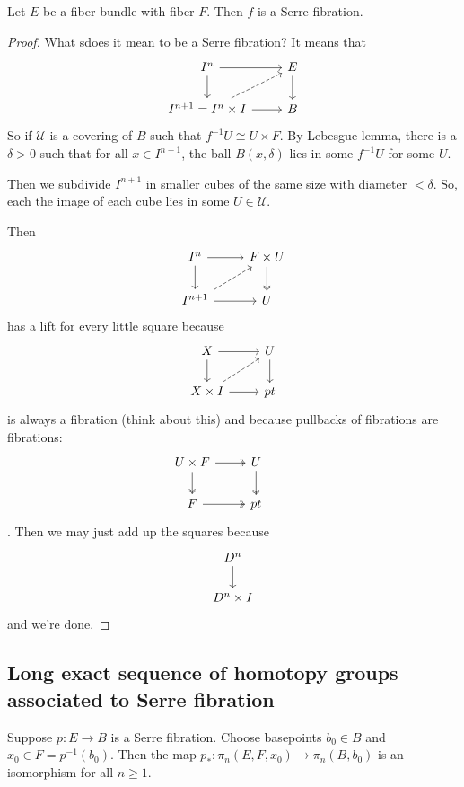 \begin{definition}
\begin{proposition}[Hatcher, 4.48]
	Let $E$ be a fiber bundle with fiber $F$. Then $f$ is a Serre fibration.
\end{proposition}
\begin{proof}
	What sdoes it mean to be a Serre fibration? It means that
	$$\begin{tikzcd}
		I^n\arrow[r]\arrow[d]&E\arrow[d]\\
		I^{n+1}=I^n\times I\arrow[r]\arrow[ur,dashed]&B
	\end{tikzcd}$$
	So if $\mathcal{U}$ is a covering of $B$ such that $f^{-1}U\cong U\times F$. By Lebesgue lemma, there is a $\delta>0$ such that for all $x\in I^{n+1}$, the ball $B(x,\delta)$ lies in some $f^{-1}U$ for some $U$.
	
	Then we subdivide $I^{n+1}$ in smaller cubes of the same size with diameter $<\delta$. So, each the image of each cube lies in some $U\in\mathcal{U}$.
	
	Then
	$$\begin{tikzcd}
		I^n\arrow[d]\arrow[r]&F\times U\arrow[d,two heads]\\
		I^{n+1}\arrow[r]\arrow[ur,dashed]&U
	\end{tikzcd}$$
	has a lift for every little square because
	$$\begin{tikzcd}
		X\arrow[r]\arrow[d]&U\arrow[d]\\
		X\times I\arrow[r]\arrow[ur,dashed]&pt
	\end{tikzcd}$$
	is always a fibration {\color{orange}(think about this)} and because pullbacks of fibrations are fibrations:
	$$\begin{tikzcd}
		U\times F\arrow[r,two heads]\arrow[d,two heads]&U\arrow[d,two heads]&\\
		F\arrow[r,two heads]&pt
	\end{tikzcd}$$.
	Then we may just add up the squares because
	$$\begin{tikzcd}
		D^n\arrow[d]\\
		D^n\times I
	\end{tikzcd}$$
	and we're done.
\end{proof}

\subsection{Long exact sequence of homotopy groups associated to Serre fibration}
\begin{theorem}[Hatcher 4.41]
	Suppose $p:E\to B$ is a Serre fibration. Choose basepoints $b_{0}\in B$ and $x_{0}\in F=p^{-1}(b_{0})$. Then the map $p_{*}:\pi_{n}(E,F,x_{0})\to \pi_{n}(B,b_{0})$ is an isomorphism for all $n\geq 1$.


\end{theorem}
\end{definition}
